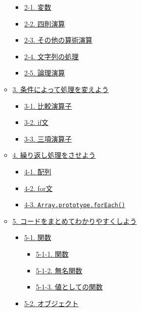\begin{itemize}
\begin{itemize}
    \begin{itemize}
    \tightlist
    \item
      \hyperref[2-1-ux5909ux6570]{2-1. 変数}
    \item
      \hyperref[2-2-ux56dbux5247ux6f14ux7b97]{2-2. 四則演算}
    \item
      \hyperref[2-3-ux305dux306eux4ed6ux306eux7b97ux8853ux6f14ux7b97]{2-3.
      その他の算術演算}
    \item
      \hyperref[2-4-ux6587ux5b57ux5217ux306eux51e6ux7406]{2-4.
      文字列の処理}
    \item
      \hyperref[2-5-ux8ad6ux7406ux6f14ux7b97]{2-5. 論理演算}
    \end{itemize}
  \item
    \hyperref[3-ux6761ux4ef6ux306bux3088ux3063ux3066ux51e6ux7406ux3092ux5909ux3048ux3088ux3046]{3.
    条件によって処理を変えよう}

    \begin{itemize}
    \tightlist
    \item
      \hyperref[3-1-ux6bd4ux8f03ux6f14ux7b97ux5b50]{3-1. 比較演算子}
    \item
      \hyperref[3-2-ifux6587]{3-2. if文}
    \item
      \hyperref[3-3-ux4e09ux9805ux6f14ux7b97ux5b50]{3-3. 三項演算子}
    \end{itemize}
  \item
    \hyperref[4-ux7e70ux308aux8fd4ux3057ux51e6ux7406ux3092ux3055ux305bux3088ux3046]{4.
    繰り返し処理をさせよう}

    \begin{itemize}
    \tightlist
    \item
      \hyperref[4-1-ux914dux5217]{4-1. 配列}
    \item
      \hyperref[4-2-forux6587]{4-2. for文}
    \item
      \hyperref[4-3-arrayprototypeforeach]{4-3.
      \texttt{Array.prototype.forEach()}}
    \end{itemize}
  \item
    \hyperref[5-ux30b3ux30fcux30c9ux3092ux307eux3068ux3081ux3066ux308fux304bux308aux3084ux3059ux304fux3057ux3088ux3046]{5.
    コードをまとめてわかりやすくしよう}

    \begin{itemize}
    \tightlist
    \item
      \hyperref[5-1-ux95a2ux6570]{5-1. 関数}

      \begin{itemize}
      \tightlist
      \item
        \hyperref[5-1-1-ux95a2ux6570]{5-1-1. 関数}
      \item
        \hyperref[5-1-2-ux7121ux540dux95a2ux6570]{5-1-2. 無名関数}
      \item
        \hyperref[5-1-3-ux5024ux3068ux3057ux3066ux306eux95a2ux6570]{5-1-3.
        値としての関数}
      \end{itemize}
    \item
      \hyperref[5-2-ux30aaux30d6ux30b8ux30a7ux30afux30c8]{5-2.
      オブジェクト}


\end{itemize}
\end{itemize}
\end{itemize}

